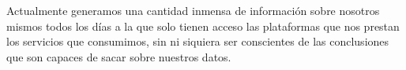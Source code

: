 Actualmente generamos una cantidad inmensa de información sobre nosotros mismos todos los días a la que solo tienen acceso las plataformas que nos prestan los servicios que consumimos, sin ni siquiera ser conscientes de las conclusiones que son capaces de sacar sobre nuestros datos.




